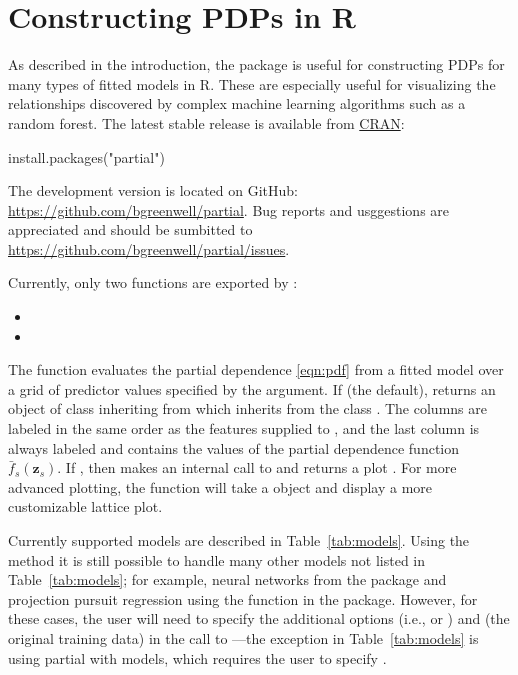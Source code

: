 \section{Constructing PDPs in R}

As described in the introduction, the  package is useful for constructing PDPs for many types of fitted models in R. These are especially useful for visualizing the relationships discovered by complex machine learning algorithms such as a random forest. The latest stable release is available from \href{https://cran.r-project.org/package=partial}{CRAN}:
\begin{example}
install.packages("partial")
\end{example}
The development version is located on GitHub: \url{https://github.com/bgreenwell/partial}. Bug reports and usggestions are appreciated and should be sumbitted to \url{https://github.com/bgreenwell/partial/issues}.

Currently, only two functions are exported by :
\begin{itemize}
  \item {}
  \item {}
\end{itemize}
The  function evaluates the partial dependence \eqref{eqn:pdf} from a fitted model over a grid of predictor values specified by the  argument. If  (the default),  returns an object of class inheriting from  which inherits from the class . The columns are labeled in the same order as the features supplied to , and the last column is always labeled  and contains the values of the partial dependence function $\bar{f}_s\left(\boldsymbol{z}_s\right)$. If , then  makes an internal call to  and returns a  plot \citep{lattice-pkg}. For more advanced plotting, the  function will take a  object and display a more customizable lattice plot.


Currently supported models are described in Table~\ref{tab:models}. Using the  method it is still possible to handle many other models not listed in Table~\ref{tab:models}; for example, neural networks from the  package \citep{venables-modern-2002} and projection pursuit regression \citep{friedman-ppr-1981} using the  function in the  package. However, for these cases, the user will need to specify the additional options  (i.e.,  or ) and  (the original training data) in the call to ---the exception in Table~\ref{tab:models} is using partial with  models, which requires the user to specify .

